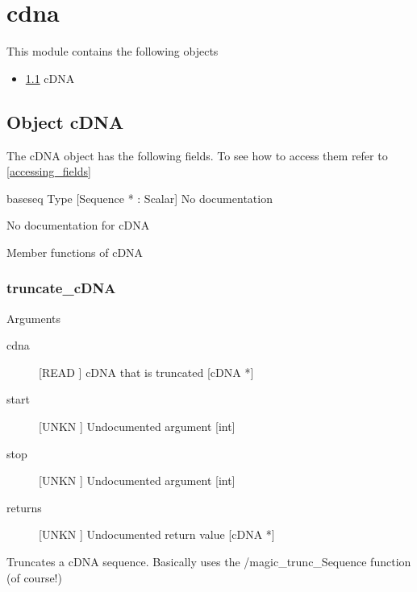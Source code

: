 \section{cdna}
\label{module_cdna}
This module contains the following objects

\begin{itemize}
\item \ref{object_cDNA} cDNA

\end{itemize}
\subsection{Object cDNA}

\label{object_cDNA}

The cDNA object has the following fields. To see how to access them refer to \ref{accessing_fields}
\begin{description}
\item{baseseq} Type [Sequence * : Scalar] No documentation

\end{description}
No documentation for cDNA

Member functions of cDNA

\subsubsection{truncate_cDNA}

Arguments
\begin{description}
\item[cdna] [READ ] cDNA that is truncated [cDNA *]
\item[start] [UNKN ] Undocumented argument [int]
\item[stop] [UNKN ] Undocumented argument [int]
\item[returns] [UNKN ] Undocumented return value [cDNA *]
\end{description}
Truncates a cDNA sequence. Basically uses
the /magic_trunc_Sequence function (of course!)


